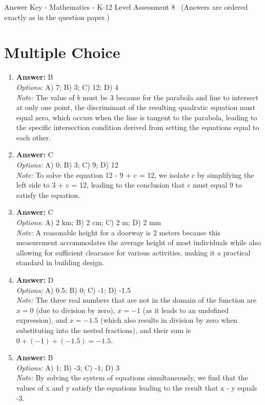 \documentclass[12pt]{article}
\begin{document}
\begin{center}
Answer Key - Mathematics - K-12 Level Assessment 8 \
\small (Answers are ordered exactly as in the question paper.)
\end{center}

\section*{Multiple Choice}
\begin{enumerate}[label=\arabic*.]
\item \textbf{Answer:} B
\\ \textit{Options:} A) 7; B) 3; C) 12; D) 4
\\ \textit{Note:} The value of $b$ must be 3 because for the parabola and line to intersect at only one point, the discriminant of the resulting quadratic equation must equal zero, which occurs when the line is tangent to the parabola, leading to the specific intersection condition derived from setting the equations equal to each other.
\item \textbf{Answer:} C
\\ \textit{Options:} A) 0; B) 3; C) 9; D) 12
\\ \textit{Note:} To solve the equation 12 - 9 + c = 12, we isolate c by simplifying the left side to 3 + c = 12, leading to the conclusion that c must equal 9 to satisfy the equation.
\item \textbf{Answer:} C
\\ \textit{Options:} A) 2 km; B) 2 cm; C) 2 m; D) 2 mm
\\ \textit{Note:} A reasonable height for a doorway is 2 meters because this measurement accommodates the average height of most individuals while also allowing for sufficient clearance for various activities, making it a practical standard in building design.
\item \textbf{Answer:} D
\\ \textit{Options:} A) 0.5; B) 0; C) -1; D) -1.5
\\ \textit{Note:} The three real numbers that are not in the domain of the function are \( x = 0 \) (due to division by zero), \( x = -1 \) (as it leads to an undefined expression), and \( x = -1.5 \) (which also results in division by zero when substituting into the nested fractions), and their sum is \( 0 + (-1) + (-1.5) = -1.5 \).
\item \textbf{Answer:} B
\\ \textit{Options:} A) 1; B) -3; C) -1; D) 3
\\ \textit{Note:} By solving the system of equations simultaneously, we find that the values of x and y satisfy the equations leading to the result that x - y equals -3.
\end{enumerate}
\end{document}
